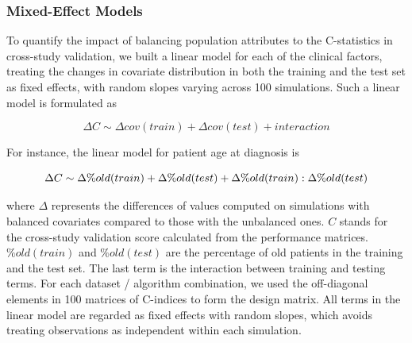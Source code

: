 \documentclass{bioinfo}
\begin{document}
  	\subsubsection{Mixed-Effect Models}
  	To quantify the impact of balancing population attributes to the C-statistics
  	in cross-study validation, we built a linear model for each of the clinical factors, treating the
  	changes in covariate distribution in both the training and the test set 
  	as fixed effects, with random slopes varying across 100 simulations. 
  	Such a linear model is formulated as
  	
  	\begin{equation}\label{linmod}
      \Delta C \sim \Delta cov(train) + \Delta cov(test) + interaction
    \end{equation}
    
    For instance, the linear model for patient age at diagnosis is
  
	
	\begin{equation}
		\footnotesize
		\Delta C \sim \Delta \%old(train) + \Delta \%old(test) + \Delta \%old(train):\Delta \%old(test)
	\end{equation}	
	
	where $\Delta$ represents the differences of values computed on
	simulations with balanced covariates compared to those with the unbalanced ones. $C$ stands for the cross-study validation score 
	calculated from the performance matrices. $\%old(train)$ and $\%old(test)$ are the percentage 
	of old patients in the training and the test set. The last term is the interaction 
	between training and testing terms. For each dataset / algorithm combination, we 
	used the off-diagonal elements in 100 matrices of C-indices to form the design matrix. All terms 
	in the linear model are regarded as fixed effects with random slopes, 
	which avoids treating observations as independent within each simulation. %
	
\end{document}

